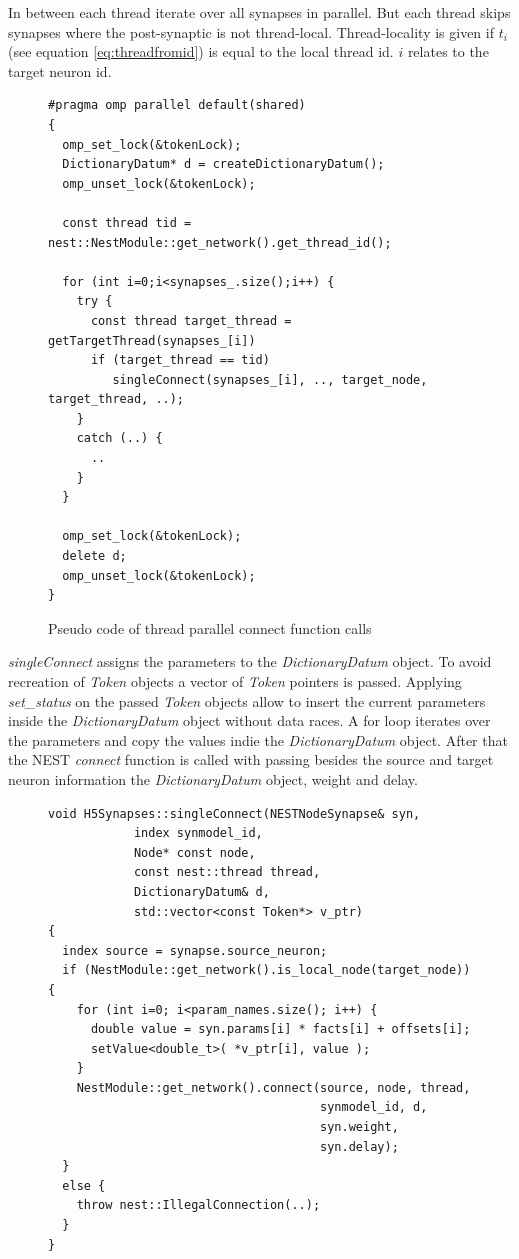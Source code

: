 In between each thread iterate over all synapses in parallel.
But each thread skips synapses where the post-synaptic is not thread-local.
Thread-locality is given if $t_i$ (see equation \ref{eq:threadfromid}) is equal to the local thread id.
$i$ relates to the target neuron id.
\begin{figure}[ht!]
\begin{lstlisting}[style=cppcode]
#pragma omp parallel default(shared)
{ 
  omp_set_lock(&tokenLock);
  DictionaryDatum* d = createDictionaryDatum();  
  omp_unset_lock(&tokenLock);

  const thread tid = nest::NestModule::get_network().get_thread_id();
      
  for (int i=0;i<synapses_.size();i++) {
    try {
      const thread target_thread = getTargetThread(synapses_[i])
      if (target_thread == tid)
	     singleConnect(synapses_[i], .., target_node, target_thread, ..);
    }
    catch (..) {
      ..
    }
  }
  
  omp_set_lock(&tokenLock);
  delete d;  
  omp_unset_lock(&tokenLock);
}
\end{lstlisting}
\caption{Pseudo code of thread parallel connect function calls}
\end{figure}
\emph{singleConnect} assigns the parameters to the \emph{DictionaryDatum} object.
To avoid recreation of \emph{Token} objects a vector of  \emph{Token} pointers is
passed. Applying \emph{set\_{}status} on the passed \emph{Token} objects allow to
insert the current parameters inside the \emph{DictionaryDatum} object without data races.
A for loop iterates over the parameters and copy the values indie the \emph{DictionaryDatum} object.
After that the NEST \emph{connect} function is called with passing besides the source and target
neuron information the \emph{DictionaryDatum} object, weight and delay.
\begin{figure}[ht!]
\begin{lstlisting}[style=cppcode]
void H5Synapses::singleConnect(NESTNodeSynapse& syn, 
    		index synmodel_id,
    		Node* const node,
    		const nest::thread thread,
    		DictionaryDatum& d, 
    		std::vector<const Token*> v_ptr)
{
  index source = synapse.source_neuron;
  if (NestModule::get_network().is_local_node(target_node)) { 
    for (int i=0; i<param_names.size(); i++) {
      double value = syn.params[i] * facts[i] + offsets[i];
      setValue<double_t>( *v_ptr[i], value );
    }
    NestModule::get_network().connect(source, node, thread,
                                      synmodel_id, d,
                                      syn.weight,
                                      syn.delay);
  }
  else {
    throw nest::IllegalConnection(..);
  }
}
\end{lstlisting}
\caption{}
\end{figure}

